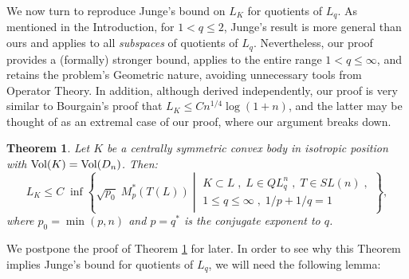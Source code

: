 \documentclass[12pt,oneside]{amsart}
\newtheorem{thm}{Theorem}[section] %
\theoremstyle{definition}
\theoremstyle{remark}
\theoremstyle{proof}
\numberwithin{equation}{section}
\newcommand{\set}[1]{\left\{#1\right\}}
\newcommand{\brac}[1]{\left(#1\right)}
\newcommand{\Vol}[1]{\textnormal{Vol} (#1)}
\newcommand{\VolRatio}[2]{\brac{\frac{\Vol{#1}}{\Vol{#2}}}^{1/n}}
\begin{document}
\medskip

We now turn to reproduce Junge's bound on $L_K$ for quotients of
$L_q$. As mentioned in the Introduction, for $1 < q \leq 2$,
Junge's result is more general than ours and applies to all
\emph{subspaces} of quotients of $L_q$. Nevertheless, our proof
provides a (formally) stronger bound, applies to the entire range
$1 < q \leq \infty$, and retains the problem's Geometric nature,
avoiding unnecessary tools from Operator Theory.
In addition, although derived independently, our proof is very
similar to Bourgain's proof that $L_K \leq C n^{1/4} \log(1+n)$,
and the latter may be thought of as an extremal case of our
proof, where our argument breaks down.

\begin{thm} \label{thm:main1-dual}
Let $K$ be a centrally symmetric convex body in isotropic
position with $\Vol{K}=\Vol{D_n}$. Then:
\[
L_K \leq C \; \inf \set{ \sqrt{p_0} \; M^*_p(T(L)) \; \left | \:
\begin{array}{c} K \subset L \; , \; L \in QL_q^n \; , \; T \in
SL(n) \; , \\  1\leq q\leq\infty \; , \; 1/p + 1/q = 1
\end{array} \right . },
\]
where $p_0 = \min(p,n)$ and $p = q^*$ is the conjugate exponent
to $q$.
\end{thm}

We postpone the proof of Theorem \ref{thm:main1-dual} for later.
In order to see why this Theorem implies Junge's bound for
quotients of $L_q$, we will need the following lemma:

\end{document}
